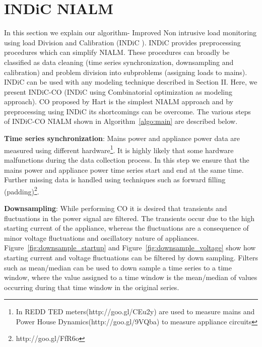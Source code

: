 \documentclass[conference]{IEEEtran}
\newcommand{\figref}[1]{Figure~\ref{#1}}
\newcommand{\algoref}[1]{Algorithm~\ref{#1}}
\newcommand{\indic}{INDiC }
\begin{document}
\section{INDiC NIALM}
\noindent In this section we explain our algorithm- Improved Non intrusive load monitoring using load Division and Calibration (\indic). \indic provides preprocessing procedures which can simplify NIALM. These procedures can broadly be classified as data cleaning (time series synchronization, downsampling and calibration) and problem division into subproblems (assigning loads to mains). \indic can be used with any modeling technique described in Section II. Here, we present INDiC-CO (INDiC using Combinatorial optimization as modeling approach). CO proposed by Hart\cite{hart} is the simplest NIALM approach and by preprocessing using \indic  its shortcomings can be overcome. The various steps of INDiC-CO NIALM shown in \algoref{algo:main} are described below. 

\noindent\textbf{Time series synchronization}: Mains power and appliance power data are measured using different hardware\footnote{In REDD\cite{redd} TED meters(http://goo.gl/CEu2y) are used to measure mains and Power House Dynamics(http://goo.gl/9VQba) to measure appliance circuits}. It is highly likely that some hardware malfunctions during the data collection process. In this step we ensure that the mains power and appliance power time series start and end at the same time. Further missing data is handled using techniques such as forward filling (padding)\footnote{http://goo.gl/FfR6o}.

\noindent\textbf{Downsampling}: While performing CO it is desired that transients and fluctuations in the power signal are filtered\cite{hart}. The transients occur due to the high starting current of the appliance, whereas the fluctuations are a consequence of minor voltage fluctuations and oscillatory nature of appliances. \figref{fig:downsample_startup} and \figref{fig:downsample_voltage} show how starting current and voltage fluctuations can be filtered by down sampling. Filters such as mean/median can be used to down sample a time series to a time window, where the value assigned to a time window is the mean/median of values occurring during that time window in the original series.
\end{document}
